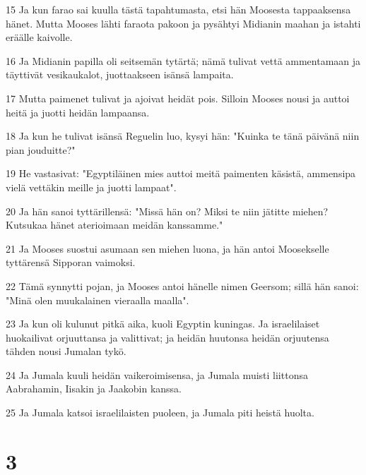 \par 15 Ja kun farao sai kuulla tästä tapahtumasta, etsi hän Moosesta tappaaksensa hänet. Mutta Mooses lähti faraota pakoon ja pysähtyi Midianin maahan ja istahti eräälle kaivolle.
\par 16 Ja Midianin papilla oli seitsemän tytärtä; nämä tulivat vettä ammentamaan ja täyttivät vesikaukalot, juottaakseen isänsä lampaita.
\par 17 Mutta paimenet tulivat ja ajoivat heidät pois. Silloin Mooses nousi ja auttoi heitä ja juotti heidän lampaansa.
\par 18 Ja kun he tulivat isänsä Reguelin luo, kysyi hän: "Kuinka te tänä päivänä niin pian jouduitte?"
\par 19 He vastasivat: "Egyptiläinen mies auttoi meitä paimenten käsistä, ammensipa vielä vettäkin meille ja juotti lampaat".
\par 20 Ja hän sanoi tyttärillensä: "Missä hän on? Miksi te niin jätitte miehen? Kutsukaa hänet aterioimaan meidän kanssamme."
\par 21 Ja Mooses suostui asumaan sen miehen luona, ja hän antoi Moosekselle tyttärensä Sipporan vaimoksi.
\par 22 Tämä synnytti pojan, ja Mooses antoi hänelle nimen Geersom; sillä hän sanoi: "Minä olen muukalainen vieraalla maalla".
\par 23 Ja kun oli kulunut pitkä aika, kuoli Egyptin kuningas. Ja israelilaiset huokailivat orjuuttansa ja valittivat; ja heidän huutonsa heidän orjuutensa tähden nousi Jumalan tykö.
\par 24 Ja Jumala kuuli heidän vaikeroimisensa, ja Jumala muisti liittonsa Aabrahamin, Iisakin ja Jaakobin kanssa.
\par 25 Ja Jumala katsoi israelilaisten puoleen, ja Jumala piti heistä huolta.

\chapter{3}

